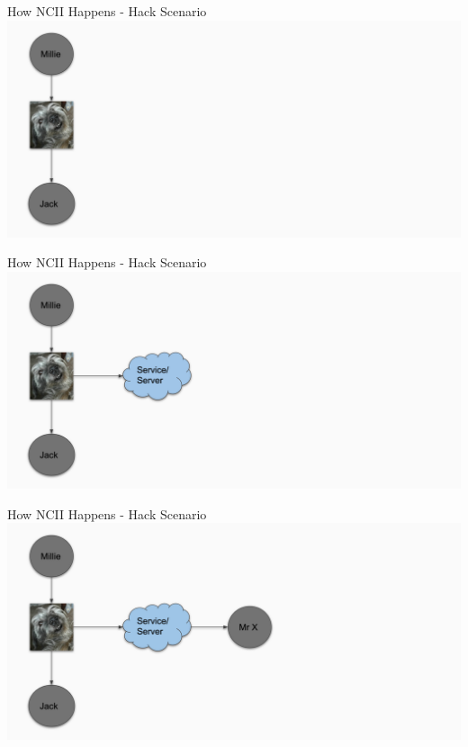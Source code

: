 \documentclass[nobackground,dvipsnames,table,aspectratio=169]{beamer}
\begin{document}
\begin{frame}{How NCII Happens - Hack Scenario}
    \includegraphics[width=\textwidth]{hack-ncii-diagram-1}
\end{frame}

\begin{frame}{How NCII Happens - Hack Scenario}
    \includegraphics[width=\textwidth]{hack-ncii-diagram-2}
\end{frame}

\begin{frame}{How NCII Happens - Hack Scenario}
    \includegraphics[width=\textwidth]{hack-ncii-diagram-3}
\end{frame}
\end{document}

